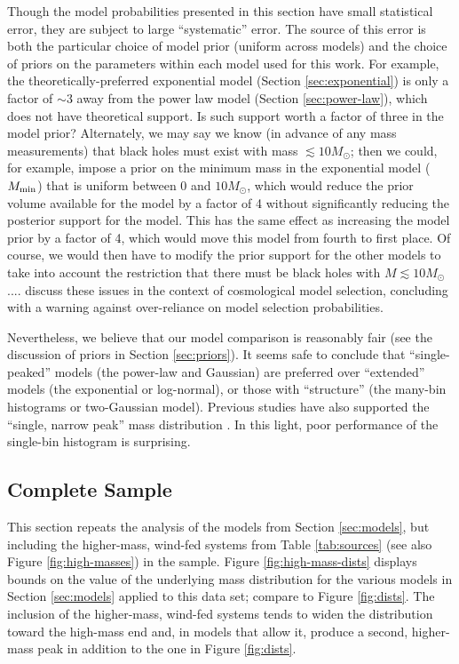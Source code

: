 \documentclass[preprint]{aastex}
\newcommand{\Msun}{M_\odot}
\newcommand{\Mmin}{M_{\textnormal{min}}}
\begin{document}
Though the model probabilities presented in this section have small
statistical error, they are subject to large ``systematic'' error.
The source of this error is both the particular choice of model prior
(uniform across models) and the choice of priors on the parameters
within each model used for this work.  For example, the
theoretically-preferred exponential model (Section
\ref{sec:exponential}) is only a factor of $\sim 3$ away from the
power law model (Section \ref{sec:power-law}), which does not have
theoretical support.  Is such support worth a factor of three in the
model prior?  Alternately, we may say we know (in advance of any mass
measurements) that black holes must exist with mass $\lesssim
10\Msun$; then we could, for example, impose a prior on the minimum
mass in the exponential model ($\Mmin$) that is uniform between $0$
and $10 \Msun$, which would reduce the prior volume available for the
model by a factor of 4 without significantly reducing the posterior
support for the model.  This has the same effect as increasing the
model prior by a factor of 4, which would move this model from fourth
to first place.  Of course, we would then have to modify the prior
support for the other models to take into account the restriction that
there must be black holes with $M \lesssim 10\Msun$....
\citet{Linder2008} discuss these issues in the context of cosmological
model selection, concluding with a warning against over-reliance on
model selection probabilities.

Nevertheless, we believe that our model comparison is reasonably fair
(see the discussion of priors in Section \ref{sec:priors}).  It seems
safe to conclude that ``single-peaked'' models (the power-law and
Gaussian) are preferred over ``extended'' models (the exponential or
log-normal), or those with ``structure'' (the many-bin histograms or
two-Gaussian model).  Previous studies have also supported the
``single, narrow peak'' mass distribution \citep{Bailyn1998,Ozel2010}.
In this light, poor performance of the single-bin histogram is
surprising.

\subsection{Complete Sample}
\label{sec:higher-mass}

This section repeats the analysis of the models from Section
\ref{sec:models}, but including the higher-mass, wind-fed systems from
Table \ref{tab:sources} (see also Figure \ref{fig:high-masses}) in the
sample.  Figure \ref{fig:high-mass-dists} displays bounds on the value
of the underlying mass distribution for the various models in Section
\ref{sec:models} applied to this data set; compare to Figure
\ref{fig:dists}.  The inclusion of the higher-mass, wind-fed systems
tends to widen the distribution toward the high-mass end and, in
models that allow it, produce a second, higher-mass peak in addition
to the one in Figure \ref{fig:dists}.
\end{document}

